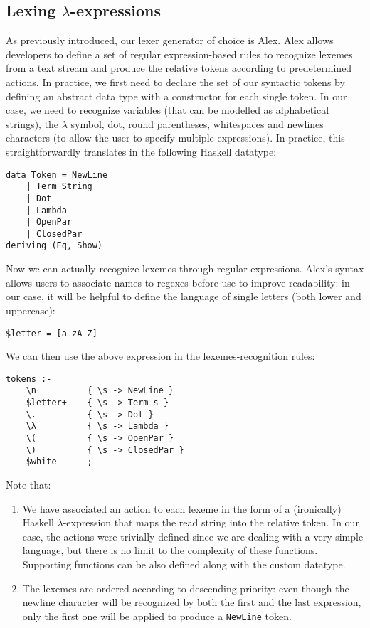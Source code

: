 \documentclass{article}
\begin{document}
\subsection{Lexing $\lambda$-expressions} \label{sec:lexing}

As previously introduced, our lexer generator of choice is Alex. Alex allows developers to define a set of regular expression-based rules to recognize lexemes from a text stream and produce the relative tokens according to predetermined actions. In practice, we first need to declare the set of our syntactic tokens by defining an abstract data type with a constructor for each single token. In our case, we need to recognize variables (that can be modelled as alphabetical strings), the $\lambda$ symbol, dot, round parentheses, whitespaces and newlines characters (to allow the user to specify multiple expressions). In practice, this straightforwardly translates in the following Haskell datatype:

\begin{lstlisting}
data Token = NewLine
    | Term String
    | Dot
    | Lambda
    | OpenPar
    | ClosedPar
deriving (Eq, Show)
\end{lstlisting}

Now we can actually recognize lexemes through regular expressions. Alex's syntax allows users to associate names to regexes before use to improve readability: in our case, it will be helpful to define the language of single letters (both lower and uppercase):

\begin{lstlisting}
$letter = [a-zA-Z]
\end{lstlisting}

We can then use the above expression in the lexemes-recognition rules:

\begin{lstlisting}
tokens :-
    \n          { \s -> NewLine }
    $letter+    { \s -> Term s }
    \.          { \s -> Dot }
    \λ          { \s -> Lambda }
    \(          { \s -> OpenPar }
    \)          { \s -> ClosedPar }
    $white      ;
\end{lstlisting}

Note that:

\begin{enumerate}
    \item We have associated an action to each lexeme in the form of a (ironically) Haskell $\lambda$-expression that maps the read string into the relative token. In our case, the actions were trivially defined since we are dealing with a very simple language, but there is no limit to the complexity of these functions. Supporting functions can be also defined along with the custom datatype.
    \item The lexemes are ordered according to descending priority: even though the newline character will be recognized by both the first and the last expression, only the first one will be applied to produce a \lstinline|NewLine| token.
\end{enumerate}
\end{document}
